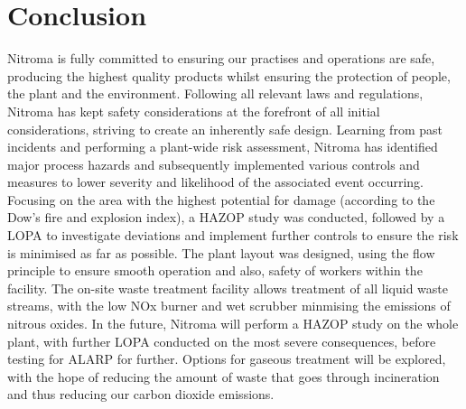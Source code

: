 \section{Conclusion}

Nitroma is fully committed to ensuring our practises and operations are safe, producing the highest quality products whilst ensuring the protection of people, the plant and the environment. Following all relevant laws and regulations, Nitroma has kept safety considerations at the forefront of all initial considerations, striving to create an inherently safe design. Learning from past incidents and performing a plant-wide risk assessment, Nitroma has identified major process hazards and subsequently implemented various controls and measures to lower severity and likelihood of the associated event occurring. Focusing on the area with the highest potential for damage (according to the Dow’s fire and explosion index), a HAZOP study was conducted, followed by a LOPA to investigate deviations and implement further controls to ensure the risk is minimised as far as possible. The plant layout was designed, using the flow principle to ensure smooth operation and also, safety of workers within the facility. The on-site waste treatment facility allows treatment of all liquid waste streams, with the low NOx burner and wet scrubber minmising the emissions of nitrous oxides. In the future, Nitroma will perform a HAZOP study on the whole plant, with further LOPA conducted on the most severe consequences, before testing for ALARP for further. Options for gaseous treatment will be explored, with the hope of reducing the amount of waste that goes through incineration and thus reducing our carbon dioxide emissions. 